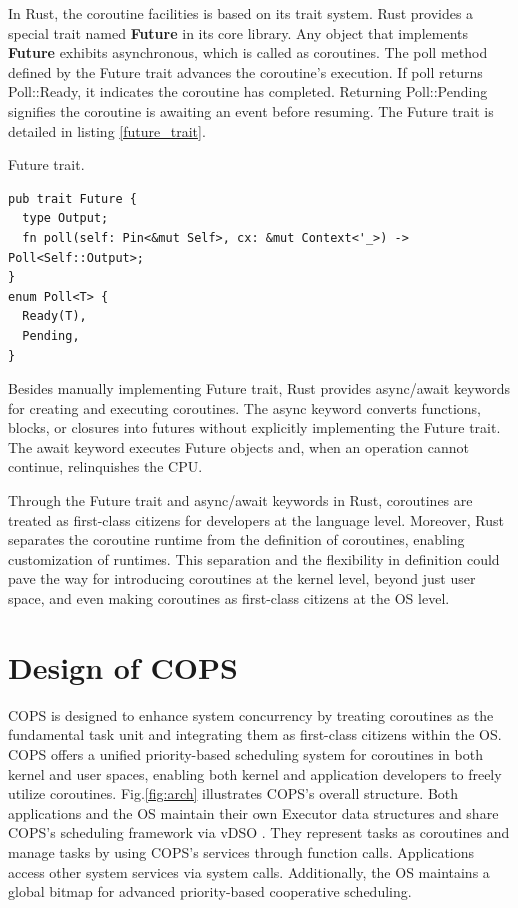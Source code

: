 \documentclass[conference]{IEEEtran}
\begin{document}
In Rust, the coroutine facilities is based on its trait system. Rust provides a special trait named \textbf{Future} in its core library. Any object that implements \textbf{Future} exhibits asynchronous, which is called as coroutines. The poll method defined by the Future trait advances the coroutine's execution. If poll returns Poll::Ready, it indicates the coroutine has completed. Returning Poll::Pending signifies the coroutine is awaiting an event before resuming. The Future trait is detailed in listing \ref{future_trait}.

\begin{listing}[tbp]
\caption{Future trait.}
\label{future_trait}
\begin{mdframed}
\begin{verbatim}
pub trait Future {
  type Output;
  fn poll(self: Pin<&mut Self>, cx: &mut Context<'_>) -> Poll<Self::Output>;
}
enum Poll<T> {
  Ready(T),
  Pending,
}
\end{verbatim}
\end{mdframed}
\end{listing}

Besides manually implementing Future trait, Rust provides async/await keywords for creating and executing coroutines. The async keyword converts functions, blocks, or closures into futures without explicitly implementing the Future trait. The await keyword executes Future objects and, when an operation cannot continue, relinquishes the CPU.

Through the Future trait and async/await keywords in Rust, coroutines are treated as first-class citizens for developers at the language level. Moreover, Rust separates the coroutine runtime from the definition of coroutines, enabling customization of runtimes. This separation and the flexibility in definition could pave the way for introducing coroutines at the kernel level, beyond just user space, and even making coroutines as first-class citizens at the OS level.

\section{Design of COPS}
\label{section: design}

COPS is designed to enhance system concurrency by treating coroutines as the fundamental task unit and integrating them as first-class citizens within the OS. COPS offers a unified priority-based scheduling system for coroutines in both kernel and user spaces, enabling both kernel and application developers to freely utilize coroutines. Fig.\ref{fig:arch} illustrates COPS's overall structure. Both applications and the OS maintain their own Executor data structures and share COPS's scheduling framework via vDSO \cite{michael_kerrisk_vdso7_2023}. They represent tasks as coroutines and manage tasks by using COPS's services through function calls. Applications access other system services via system calls. Additionally, the OS maintains a global bitmap for advanced priority-based cooperative scheduling.
\end{document}

